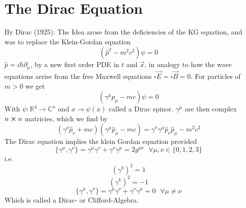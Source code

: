 \documentclass{report}
\begin{document}
\section{The Dirac Equation}
By Dirac (1925): The Idea arose from the deficiencies of the KG equation, and was to replace the Klein-Gordan equation  \[
  \left( \hat{p}^2 - m^2c^2 \right) \psi = 0
\] $\hat{p} = i\hbar \partial_\mu $, by a new first order PDE in $t$ and $\vec{x}$, in analogy to how the wave equations arrise from the free Maxwell equations $\square \vec{E} = \square \vec{B} = 0$. For particles of $m>0$ we get \[
\left( \gamma^\mu p_\mu - mc \right) \psi = 0
\] With $\psi: \mathbb{R}^{4} \to \mathbb{C}^{n}$ and $x\to \psi\left( x \right) $ called a Dirac spinor. $\gamma^\mu$ are then complex $n \cross n$ matricies, which we find by \[
\left( \gamma^\nu \hat{p}_\nu + mc \right) \left( \gamma^\mu \hat{p}_\mu - mc \right) = \gamma^\nu \gamma^\mu \hat{p}_\nu \hat{p}_\mu - m^2c^2
\] 
The Dirac equation implies the klein Gordan equation provided
\[
  \{\gamma^\mu, \gamma^\nu\} = \gamma^\mu\gamma^\nu + \gamma^\nu \gamma^\mu = 2 g^{\mu\nu} \text{   } \forall  \mu, \nu \in \{0,1,2,3\}
\] 
i.e. \[
  \left( \gamma^0 \right) ^2 = 1
\] \[
\left( \gamma^k \right) ^2 = -1
\] 
\[
  \{\gamma^\mu, \gamma^\nu\} = \gamma^\mu\gamma^\nu + \gamma^\nu \gamma^\mu = 0 \text{   } \forall  \mu \neq \nu 
\] 
Which is called a Dirac- or Clifford-Algebra.
\end{document}
